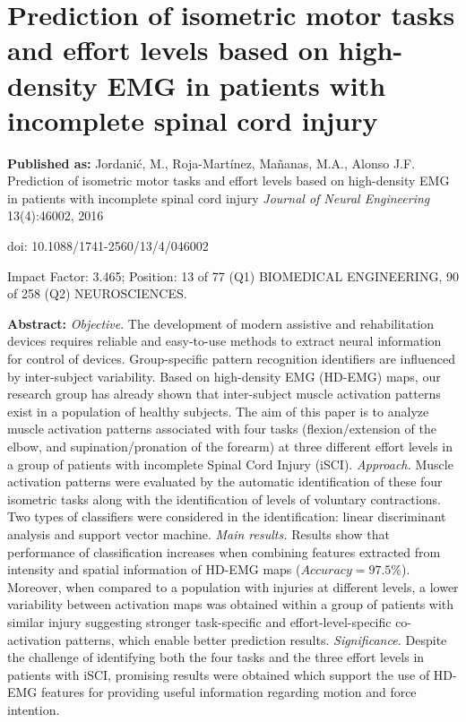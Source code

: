 \chapter[Prediction of isometric motor tasks]{Prediction of isometric motor tasks and effort levels based on high-density EMG in patients with incomplete spinal cord injury}
\label{ch:p2}
\textbf{Published as:} 
Jordanić, M., Roja-Martínez,  Ma\~nanas, M.A., Alonso J.F.
Prediction of isometric motor tasks and effort levels based on high-density EMG in patients with incomplete spinal cord injury \textit{Journal of Neural Engineering} 13(4):46002, 2016

doi: 10.1088/1741-2560/13/4/046002

Impact Factor: 3.465; Position: 13 of 77 (Q1) BIOMEDICAL ENGINEERING, 90 of 258 (Q2) NEUROSCIENCES.


\textbf{Abstract:} \textit{Objective}. The development of modern assistive and rehabilitation devices requires reliable and easy-to-use methods to extract neural information for control of devices. Group-specific pattern recognition identifiers are influenced by inter-subject variability. Based on high-density EMG (HD-EMG) maps, our research group has already shown that inter-subject muscle activation patterns exist in a population of healthy subjects. The aim of this paper is to analyze muscle activation patterns associated with four tasks (flexion/extension of the elbow, and supination/pronation of the forearm) at three different effort levels in a group of patients with incomplete Spinal Cord Injury (iSCI). \textit{Approach.} Muscle activation patterns were evaluated by the automatic identification of these four isometric tasks along with the identification of levels of voluntary contractions. Two types of classifiers were considered in the identification: linear discriminant analysis and support vector machine. \textit{Main results.} Results show that performance of classification increases when combining features extracted from intensity and spatial information of HD-EMG maps ($Accuracy = 97.5\%$). Moreover, when compared to a population with injuries at different levels, a lower variability between activation maps was obtained within a group of patients with similar injury suggesting stronger task-specific and effort-level-specific co-activation patterns, which enable better prediction results. \textit{Significance.} Despite the challenge of identifying both the four tasks and the three effort levels in patients with iSCI, promising results were obtained which support the use of HD-EMG features for providing useful information regarding motion and force intention.

